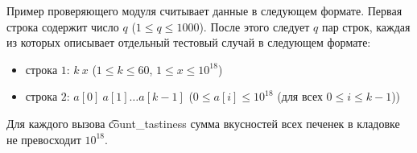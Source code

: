 Пример проверяющего модуля считывает данные в следующем формате. Первая строка содержит число $q$ ($1 \leq q \leq 1000$).
После этого следует $q$ пар строк, каждая из которых описывает отдельный тестовый случай в следующем формате:
\begin{itemize}
\item строка $1$: $k\ x$ ($1 \leq k \leq 60$, $1 \leq x \leq 10^{18}$)
\item строка $2$: $a[0]\ a[1]\ldots a[k-1]$ ($0 \leq a[i] \leq 10^{18}$ (для всех $0 \leq i \leq k-1$))
\end{itemize}

Для каждого вызова  \t{count\_tastiness} сумма вкусностей всех печенек в кладовке не превосходит $10^{18}$.
